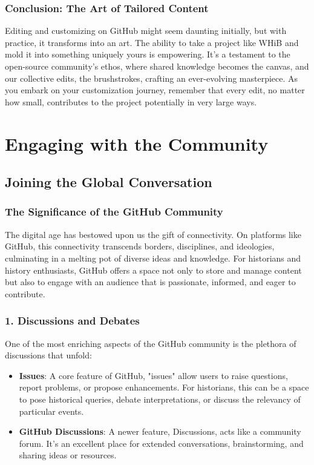 \documentclass[a4paper,12pt]{book}
\begin{document}
\subsection*{Conclusion: The Art of Tailored Content}
Editing and customizing on GitHub might seem daunting initially, but with practice, it transforms into an art. The ability to take a project like WHiB and mold it into something uniquely yours is empowering. It's a testament to the open-source community's ethos, where shared knowledge becomes the canvas, and our collective edits, the brushstrokes, crafting an ever-evolving masterpiece. As you embark on your customization journey, remember that every edit, no matter how small, contributes to the project potentially in very large ways.

\chapter{Engaging with the Community}
\section*{Joining the Global Conversation}

\subsection*{The Significance of the GitHub Community}
The digital age has bestowed upon us the gift of connectivity. On platforms like GitHub, this connectivity transcends borders, disciplines, and ideologies, culminating in a melting pot of diverse ideas and knowledge. For historians and history enthusiasts, GitHub offers a space not only to store and manage content but also to engage with an audience that is passionate, informed, and eager to contribute.

\subsection*{1. Discussions and Debates}
One of the most enriching aspects of the GitHub community is the plethora of discussions that unfold:

\begin{itemize}
    \item \textbf{Issues}: A core feature of GitHub, "issues" allow users to raise questions, report problems, or propose enhancements. For historians, this can be a space to pose historical queries, debate interpretations, or discuss the relevancy of particular events.
    \item \textbf{GitHub Discussions}: A newer feature, Discussions, acts like a community forum. It's an excellent place for extended conversations, brainstorming, and sharing ideas or resources.
\end{itemize}
\end{document}
